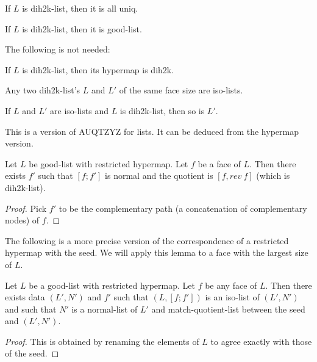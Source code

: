 \begin{lemma}
If $L$ is dih2k-list, then it is all uniq.
\end{lemma}

\begin{lemma}
If $L$ is dih2k-list, then it is good-list.
\end{lemma}

The following is not needed:

\begin{lemma} If $L$ is dih2k-list, then its hypermap is dih2k.
\end{lemma}

\begin{lemma}
Any two dih2k-list's $L$ and $L'$ of the same face size are iso-lists.
\end{lemma}

\begin{lemma}
If $L$ and $L'$ are iso-lists and $L$ is dih2k-list, then so is $L'$.
\end{lemma}

This is a version of AUQTZYZ for lists.  It can be deduced from the hypermap version.

\begin{lemma}  Let $L$ be good-list with restricted hypermap.
Let $f$ be a face of $L$.  Then there exists $f'$ such that $[f;f']$ is normal and the quotient
is $[f,rev~f]$ (which is dih2k-list).
\end{lemma}

\begin{proof} Pick $f'$ to be the complementary path (a concatenation of complementary nodes) of $f$.
\end{proof}

The following is a more precise version of the correspondence of a restricted hypermap with
the seed.  We will apply this lemma to a face with the largest size of $L$.

\begin{lemma}  Let $L$ be a good-list with restricted hypermap.   Let $f$ be any face of $L$.  Then there exists data $(L',N')$ and $f'$
such that $(L,[f;f'])$ is an iso-list of $(L',N')$ and such that $N'$ is a normal-list of $L'$ and
match-quotient-list between the seed and $(L',N')$.
\end{lemma}

\begin{proof} This is obtained by renaming the elements of $L$ to agree exactly with those of the seed.
\end{proof}

